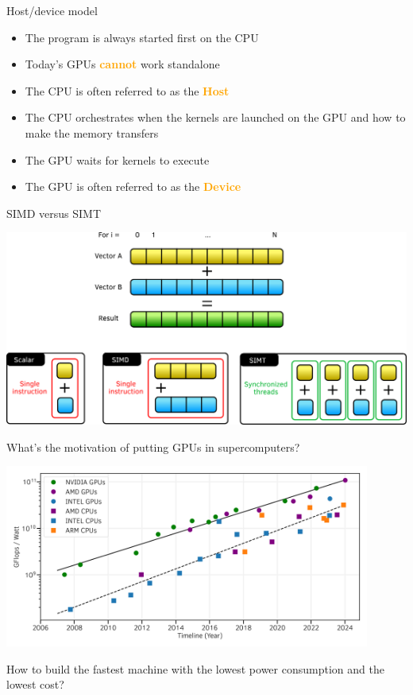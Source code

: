 \documentclass[aspectratio=169]{beamer}
\newcommand{\highlight}[1]{\textcolor{orange}{\textbf{#1}}}
\begin{document}
\begin{frame}{Host/device model}
    \begin{itemize}
        \item The program is always started first on the CPU
        \item Today's GPUs \highlight{cannot} work standalone
        \item The CPU is often referred to as the \highlight{Host}
        \item The CPU orchestrates when the kernels are launched on the GPU and how to make the memory transfers
        \item The GPU waits for kernels to execute
        \item The GPU is often referred to as the \highlight{Device}
    \end{itemize}
\end{frame}


\begin{frame}{SIMD versus SIMT}
    \begin{center}
        \includegraphics[width=\textwidth]{SIMD_vs_SIMT.png}
    \end{center}
\end{frame}


\begin{frame}{What's the motivation of putting GPUs in supercomputers?}
    \begin{center}
        \includegraphics[width=0.9\textwidth]{flop_watt_ratio_history_fp64.png}
    \end{center}

     How to build the fastest machine with the lowest power consumption and the lowest cost?
\end{frame}
\end{document}
